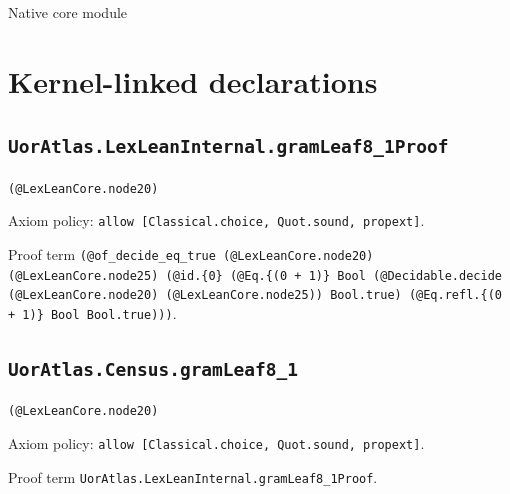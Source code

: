 \documentclass[11pt]{article}
\begin{document}
\begin{center}{\LARGE Native core module}\end{center}
\section*{Kernel-linked declarations}
\subsection*{\texttt{UorAtlas.LexLeanInternal.gramLeaf8\_1Proof}}
\noindent\texttt{(@LexLeanCore.node20)}\par
\noindent Axiom policy: \texttt{allow [Classical.choice, Quot.sound, propext]}.\par
\noindent Proof term \texttt{(@of\_decide\_eq\_true (@LexLeanCore.node20) (@LexLeanCore.node25) (@id.\{0\} (@Eq.\{(0 + 1)\} Bool (@Decidable.decide (@LexLeanCore.node20) (@LexLeanCore.node25)) Bool.true) (@Eq.refl.\{(0 + 1)\} Bool Bool.true)))}.\par
\subsection*{\texttt{UorAtlas.Census.gramLeaf8\_1}}
\noindent\texttt{(@LexLeanCore.node20)}\par
\noindent Axiom policy: \texttt{allow [Classical.choice, Quot.sound, propext]}.\par
\noindent Proof term \texttt{UorAtlas.LexLeanInternal.gramLeaf8\_1Proof}.\par
\end{document}
